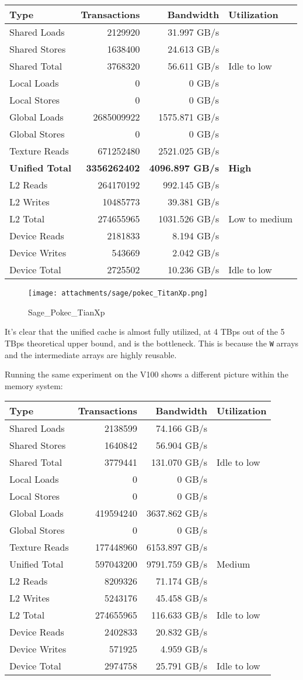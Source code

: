 \documentclass[10pt,oneside]{memoir}
\begin{document}
\begin{longtable}[]{@{}lrrl@{}}
\toprule
Type & Transactions & Bandwidth & Utilization\tabularnewline
\midrule
\endhead
Shared Loads & 2129920 & 31.997 GB/s &\tabularnewline
Shared Stores & 1638400 & 24.613 GB/s &\tabularnewline
Shared Total & 3768320 & 56.611 GB/s & Idle to low\tabularnewline
Local Loads & 0 & 0 GB/s &\tabularnewline
Local Stores & 0 & 0 GB/s &\tabularnewline
Global Loads & 2685009922 & 1575.871 GB/s &\tabularnewline
Global Stores & 0 & 0 GB/s &\tabularnewline
Texture Reads & 671252480 & 2521.025 GB/s &\tabularnewline
\textbf{Unified Total} & \textbf{3356262402} & \textbf{4096.897 GB/s} &
\textbf{High}\tabularnewline
L2 Reads & 264170192 & 992.145 GB/s &\tabularnewline
L2 Writes & 10485773 & 39.381 GB/s &\tabularnewline
L2 Total & 274655965 & 1031.526 GB/s & Low to medium\tabularnewline
Device Reads & 2181833 & 8.194 GB/s &\tabularnewline
Device Writes & 543669 & 2.042 GB/s &\tabularnewline
Device Total & 2725502 & 10.236 GB/s & Idle to low\tabularnewline
\bottomrule
\end{longtable}

\begin{figure}
\centering
\texttt{[image: attachments/sage/pokec\_TitanXp.png]}
\caption{Sage\_Pokec\_TianXp}
\end{figure}

It's clear that the unified cache is almost fully utilized, at 4 TBps
out of the 5 TBps theoretical upper bound, and is the bottleneck. This
is because the \texttt{W} arrays and the intermediate arrays are highly
reusable.

Running the same experiment on the V100 shows a different picture within
the memory system:

\begin{longtable}[]{@{}lrrl@{}}
\toprule
Type & Transactions & Bandwidth & Utilization\tabularnewline
\midrule
\endhead
Shared Loads & 2138599 & 74.166 GB/s &\tabularnewline
Shared Stores & 1640842 & 56.904 GB/s &\tabularnewline
Shared Total & 3779441 & 131.070 GB/s & Idle to low\tabularnewline
Local Loads & 0 & 0 GB/s &\tabularnewline
Local Stores & 0 & 0 GB/s &\tabularnewline
Global Loads & 419594240 & 3637.862 GB/s &\tabularnewline
Global Stores & 0 & 0 GB/s &\tabularnewline
Texture Reads & 177448960 & 6153.897 GB/s &\tabularnewline
Unified Total & 597043200 & 9791.759 GB/s & Medium\tabularnewline
L2 Reads & 8209326 & 71.174 GB/s &\tabularnewline
L2 Writes & 5243176 & 45.458 GB/s &\tabularnewline
L2 Total & 274655965 & 116.633 GB/s & Idle to low\tabularnewline
Device Reads & 2402833 & 20.832 GB/s &\tabularnewline
Device Writes & 571925 & 4.959 GB/s &\tabularnewline
Device Total & 2974758 & 25.791 GB/s & Idle to low\tabularnewline
\bottomrule
\end{longtable}
\end{document}
